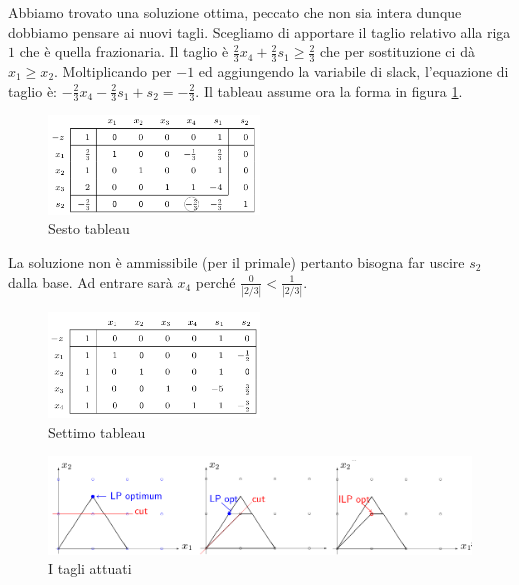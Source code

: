 \documentclass[11pt]{book}
\begin{document}
Abbiamo trovato una soluzione ottima, peccato che non sia intera
dunque dobbiamo pensare ai nuovi tagli. Scegliamo di apportare il
taglio relativo alla riga $1$ che \`e quella frazionaria. Il taglio
\`e $\frac{2}{3}x_4+ \frac{2}{3}s_1 \geq \frac{2}{3}$ che per
sostituzione ci d\`a $x_1 \geq x_2$. Moltiplicando per $-1$ ed
aggiungendo la variabile di slack, l'equazione di taglio \`e:
$-\frac{2}{3}x_4 - \frac{2}{3}s_1 + s_2 = - \frac{2}{3}$. Il tableau
assume ora la forma in figura \ref{cap6tab6}.

\begin{figure}[h!]
  \centering
  \includegraphics[width=0.5\textwidth]{images/cap6tab6.png}
  \caption{Sesto tableau}
  \label{cap6tab6}
\end{figure}

La soluzione non \`e ammissibile (per il primale) pertanto bisogna far
uscire $s_2$ dalla base. Ad entrare sar\`a $x_4$ perch\'e
$\frac{0}{|2/3|} < \frac{1}{|2/3|}$.

\begin{figure}[h!]
  \centering
  \includegraphics[width=0.5\textwidth]{images/cap6tab7.png}
  \caption{Settimo tableau}
  \label{cap6tab7}
\end{figure}

\begin{figure}[h!]
  \centering
  \includegraphics[width=\textwidth]{images/cap6esempio1.png}
  \caption{I tagli attuati}
  \label{cap6esempio1}
\end{figure}
\end{document}
